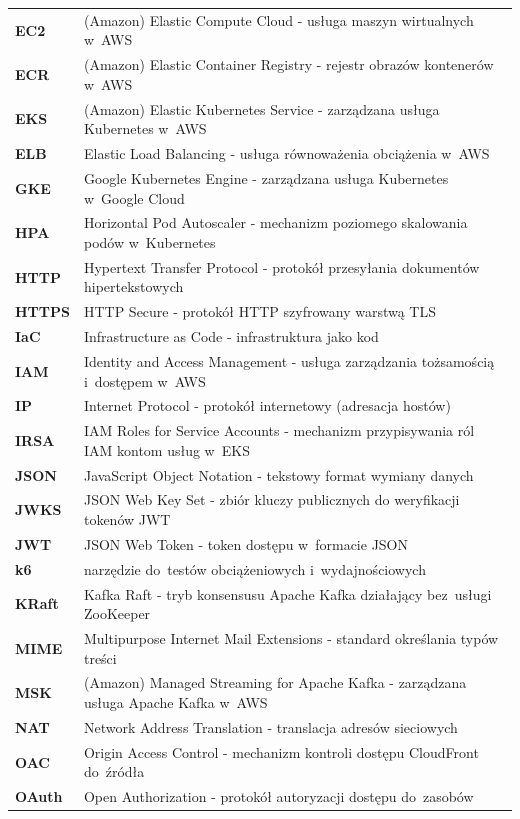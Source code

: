 \begin{longtable}{@{}>{\bfseries}l@{\hspace{1.5em}}p{}@{}}
EC2     & (Amazon) Elastic Compute Cloud - usługa maszyn wirtualnych w~AWS \\
ECR     & (Amazon) Elastic Container Registry - rejestr obrazów kontenerów w~AWS \\
EKS     & (Amazon) Elastic Kubernetes Service - zarządzana usługa Kubernetes w~AWS \\
ELB     & Elastic Load Balancing - usługa równoważenia obciążenia w~AWS \\
GKE     & Google Kubernetes Engine - zarządzana usługa Kubernetes w~Google Cloud \\
HPA     & Horizontal Pod Autoscaler - mechanizm poziomego skalowania podów w~Kubernetes \\
HTTP    & Hypertext Transfer Protocol - protokół przesyłania dokumentów hipertekstowych \\
HTTPS   & HTTP Secure - protokół HTTP szyfrowany warstwą TLS \\
IaC     & Infrastructure as Code - infrastruktura jako kod \\
IAM     & Identity and Access Management - usługa zarządzania tożsamością i~dostępem w~AWS \\
IP      & Internet Protocol - protokół internetowy (adresacja hostów) \\
IRSA    & IAM Roles for Service Accounts - mechanizm przypisywania ról IAM kontom usług w~EKS \\
JSON    & JavaScript Object Notation - tekstowy format wymiany danych \\
JWKS    & JSON Web Key Set - zbiór kluczy publicznych do weryfikacji tokenów JWT \\
JWT     & JSON Web Token - token dostępu w~formacie JSON \\
k6      & narzędzie do~testów obciążeniowych i~wydajnościowych \\
KRaft   & Kafka Raft - tryb konsensusu Apache Kafka działający bez~usługi ZooKeeper \\
MIME    & Multipurpose Internet Mail Extensions - standard określania typów treści \\
MSK     & (Amazon) Managed Streaming for Apache Kafka - zarządzana usługa Apache Kafka w~AWS \\
NAT     & Network Address Translation - translacja adresów sieciowych \\
OAC     & Origin Access Control - mechanizm kontroli dostępu CloudFront do~źródła \\
OAuth   & Open Authorization - protokół autoryzacji dostępu do~zasobów \\

\end{longtable}
